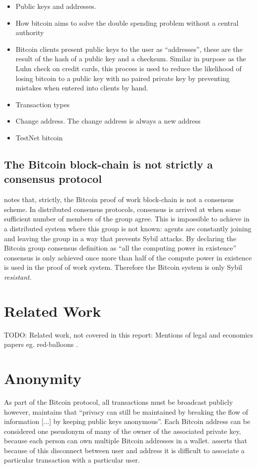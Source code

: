 \begin{itemize} \item Public keys and addresses.  \item How bitcoin aims to
        solve the double spending problem without a central authority \item
            Bitcoin clients present public keys to the user as ``addresses'',
            these are the result of the hash of a public key and a checksum.
            Similar in purpose as the Luhn check on credit cards, this process
        is used to reduce the likelihood of losing bitcoin to a public key with
    no paired private key by preventing mistakes when entered into clients by
hand.  \item Transaction types \item Change address.  The change address is
always a new address \item TestNet bitcoin \end{itemize}


\subsection{The Bitcoin block-chain is not strictly a consensus protocol}
\textcite{bitcoin-impossible} notes that, strictly, the Bitcoin proof of work block-chain is not a consensus scheme. In distributed consensus protocols, consensus is arrived at when some sufficient number of members of the group agree. This is impossible to achieve in a distributed system where this group is not known: agents are constantly joining and leaving the group in a way that prevents Sybil attacks. By declaring the Bitcoin group consensus definition as ``all the computing power in existence'' consensus is only achieved once more than half of the compute power in existence is used in the proof of work system. Therefore the Bitcoin system is only Sybil \emph{resistant}.


\section{Related Work}
TODO: Related work, not covered in this report: Mentions of legal and economics papers eg. red-balloons \cite{red-balloons}.


\section{Anonymity} As part of the Bitcoin protocol, all transactions must be broadcast publicly however, \textcite{satoshi} maintains that ``privacy can still be maintained by breaking the flow of information [...] by keeping public keys anonymous''.  Each Bitcoin address can be considered one pseudonym of many of the owner of the associated private key, because each person can own multiple Bitcoin addresses in a wallet. \textcite{satoshi} asserts that because of this disconnect between user and address it is difficult to associate a particular transaction with a particular user.


